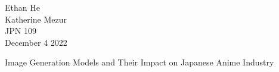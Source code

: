 \documentclass[12pt]{article}
\begin{document}
\begin{flushleft}

Ethan He\\
Katherine Mezur \\
JPN 109\\
December 4 2022\\


\begin{center}
Image Generation Models and Their Impact on Japanese Anime Industry
\end{center}











\end{flushleft}
\end{document}
